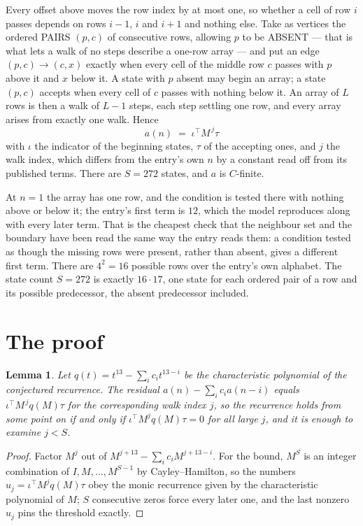 \documentclass[11pt,a4paper]{article}
\theoremstyle{plain}
\newtheorem{lemma}[theorem]{Lemma}
\theoremstyle{definition}
\begin{document}
Every offset above moves the row index by at most one, so whether a cell of row $i$ passes
depends on rows $i-1$, $i$ and $i+1$ and nothing else. Take as vertices the ordered PAIRS
$(p,c)$ of consecutive rows, allowing $p$ to be ABSENT --- that is what lets a walk of no steps
describe a one-row array --- and put an edge $(p,c)\to(c,x)$ exactly when every cell of the
middle row $c$ passes with $p$ above it and $x$ below it. A state with $p$ absent may begin an
array; a state $(p,c)$ accepts when every cell of $c$ passes with nothing below it. An array of
$L$ rows is then a walk of $L-1$ steps, each step settling one row, and every array arises from
exactly one walk. Hence
\[
a(n)\;=\;\iota^{\!\top}M^{\,j}\tau
\]
with $\iota$ the indicator of the beginning states, $\tau$ of the accepting ones, and $j$ the
walk index, which differs from the entry's own $n$ by a constant read off from its published
terms. There are $S=272$ states, and $a$ is $C$-finite.

At $n=1$ the array has one row, and
the condition is tested there with nothing above or below it; the entry's first term is
$12$, which the model reproduces along with every later term. That is the cheapest check
that the neighbour set and the boundary have been read the same way the entry reads them: a
condition tested as though the missing rows were present, rather than absent, gives a different
first term. There are $4^{2}=16$ possible rows over the entry's own alphabet. The state count $S=272$ is exactly $16\cdot17$,
one state for each ordered pair of a row and its possible predecessor, the absent predecessor
included.

\section{The proof}

\begin{lemma}\label{lem:crit}
Let $q(t)=t^{13}-\sum_i c_it^{13-i}$ be the characteristic polynomial of the
conjectured recurrence. The residual $a(n)-\sum_ic_ia(n-i)$ equals
$\iota^{\!\top}M^{\,j}q(M)\tau$ for the corresponding walk index $j$, so the recurrence
holds from some point on if and only if $\iota^{\!\top}M^{j}q(M)\tau=0$ for all large $j$,
and it is enough to examine $j<S$.
\end{lemma}

\begin{proof}
Factor $M^{j}$ out of $M^{j+13}-\sum_ic_iM^{j+13-i}$. For the bound, $M^{S}$
is an integer combination of $I,M,\dots,M^{S-1}$ by Cayley--Hamilton, so the numbers
$u_j=\iota^{\!\top}M^{j}q(M)\tau$ obey the monic recurrence given by the characteristic
polynomial of $M$; $S$ consecutive zeros force every later one, and the last nonzero $u_j$
pins the threshold exactly.
\end{proof}
\end{document}
